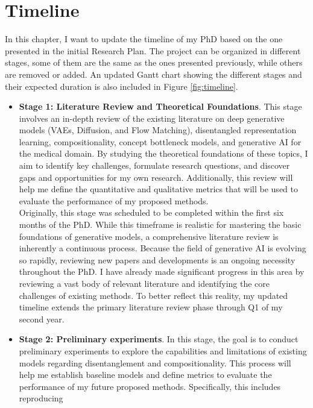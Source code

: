 \chapter{Timeline}\label{ch:timeline}

In this chapter, I want to update the timeline of my PhD based on the one presented in the initial Research Plan. The project can 
be organized in different stages, some of them are the same as the ones presented previously, while others are removed or added. 
An updated Gantt chart showing the different stages and their expected duration is also included in Figure \ref{fig:timeline}. 
\begin{itemize}
    \item \textbf{Stage 1: Literature Review and Theoretical Foundations}. This stage involves an in-depth review of the existing 
    literature on deep generative models (VAEs, Diffusion, and Flow Matching), disentangled representation learning, compositionality, 
    concept bottleneck models, and generative AI for the medical domain. By studying the theoretical foundations of these topics, 
    I aim to identify key challenges, formulate research questions, and discover gaps and opportunities for my own research. 
    Additionally, this review will help me define the quantitative and qualitative metrics that will be used to evaluate the 
    performance of my proposed methods. \\
    Originally, this stage was scheduled to be completed within the first six months of the PhD. While this timeframe is realistic 
    for mastering the basic foundations of generative models, a comprehensive literature review is inherently a continuous process. 
    Because the field of generative AI is evolving so rapidly, reviewing new papers and developments is an ongoing necessity throughout 
    the PhD. I have already made significant progress in this area by reviewing a vast body of relevant literature and identifying 
    the core challenges of existing methods. To better reflect this reality, my updated timeline extends the primary literature 
    review phase through Q1 of my second year. 
    \item \textbf{Stage 2: Preliminary experiments}. In this stage, the goal is to conduct preliminary experiments to explore the 
    capabilities and limitations of existing models regarding disentanglement and compositionality. This process will help me establish 
    baseline models and define metrics to evaluate the performance of my future proposed methods. Specifically, this includes reproducing 

\end{itemize}
